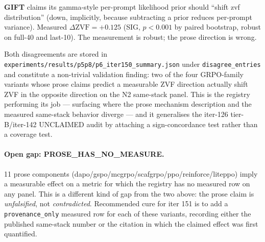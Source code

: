 \textbf{GIFT} claims its gamma-style per-prompt likelihood prior should
``shift zvf distribution'' (down, implicitly, because subtracting a
prior reduces per-prompt variance). Measured $\Delta \text{ZVF} = +0.125$
(SIG, $p < 0.001$ by paired bootstrap, robust on full-40 and last-10).
The measurement is robust; the prose direction is wrong.

Both disagreements are stored in
\texttt{experiments/results/p5p8/p6\_iter150\_summary.json} under
\texttt{disagree\_entries} and constitute a non-trivial validation
finding: two of the four GRPO-family variants whose prose claims
predict a measurable ZVF direction actually shift ZVF in the opposite
direction on the N2 same-stack panel. This is the registry performing
its job --- surfacing where the prose mechanism description and the
measured same-stack behavior diverge --- and it generalises the
iter-126 tier-B/iter-142 UNCLAIMED audit by attaching a sign-concordance
test rather than a coverage test.

\paragraph{Open gap: PROSE\_HAS\_NO\_MEASURE.}
11 prose components (dapo/gspo/mcgrpo/scafgrpo/ppo/reinforce/liteppo)
imply a measurable effect on a metric for which the registry has no
measured row on any panel. This is a different kind of gap from the two
above: the prose claim is \emph{unfalsified}, not \emph{contradicted}.
Recommended cure for iter 151 is to add a \texttt{provenance\_only}
measured row for each of these variants, recording either the published
same-stack number or the citation in which the claimed effect was first
quantified.